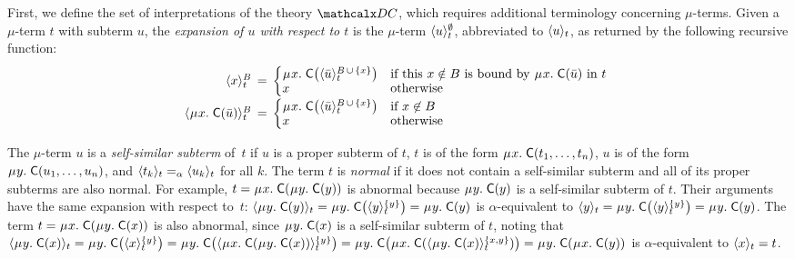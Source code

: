 First, we define the set of interpretations of the theory $\thD$,
which requires additional terminology concerning $\mu$-terms.
Given a $\mu$-term $t$ with subterm $u$,
the \emph{expansion of $u$ with respect to $t$} is the $\mu$-term $\interp{t}{u}^\emptyset$,
abbreviated to
$\interp{t}{u}$, as returned by the following recursive function:
\[\begin{array}{r@{}c@{}l}
\interp{t}{x}^B & {} \,=\, {} &
\textstyle\relax{\begin{cases}
    \MU x.\; \const{C}\smash{\bigl( \interp{t}{ \vec u}^{\smash{B \,\cup\, \{ x \}}}\bigr)} & \text{if this $x \notin B$ is
    bound by $\MU x.\; \const{C}( \vec u )$ in $t$}  \\[-\jot]
    x & \text{otherwise}
\end{cases}} ~ \\
\interp{t}{\MU x.\; \const{C}( \vec u )}^B & = &
\textstyle\begin{cases}
    \MU x.\; \const{C}\smash{\bigl( \interp{t}{ \vec u }^{\smash{B \,\cup\, \{ x \}}}\bigr)} & \text{if }x \not\in B \\[-\jot]
    x & \text{otherwise}
\end{cases}
\end{array}\]
%

The $\mu$-term $u$
is a \emph{self-similar subterm} of~$t$ if
$u$ is a proper subterm of $t$,
$t$ is of the form $\MU x.\; \const{C}( t_1, \ldots, t_n )$,
$u$ is of the form $\MU y.\; \const{C}( u_1, \ldots, u_n )$,
and $\interp{t}{ t_k } \aequiv \interp{t}{ u_k }$ for all $k$. %
The term $t$ is \emph{normal} if it does not contain a self-similar subterm
and all of its proper subterms are also normal.
For example, $t = \MU x.\; \const{C}( \MU y.\; \const{C}( y ) )$ is abnormal
because $\MU y.\; \const{C}( y )$ is a self-similar subterm of $t$.
Their arguments have the same expansion with respect to~$t$:
$\interp{t}{\MU y.\; \const{C}( y )} =
\MU y.\; \const{C}\bigl( \interp{t}{y}^{\smash{\{y\}}} \bigr) =
\MU y.\; \const{C}( y )$
is $\alpha$-equivalent to
$\interp{t}{y} =
\MU y.\; \const{C}\bigl( \interp{t}{y}^{\smash{\{y\}}} \bigr) =
\MU y.\; \const{C}( y )$.
The term $t = \MU x.\; \const{C}( \MU y.\; \const{C}( x ) )$ is also abnormal,
since $\MU y.\; \const{C}( x )$ is a self-similar subterm of $t$,
noting that
%
$\interp{t}{\MU y.\; \const{C}( x )}
 = \MU y.\; \const{C}\bigl( \interp{t}{x}^{\smash{\{y\}}} \bigr)
 = \MU y.\; \const{C}\bigl( \interp{t}{\MU x.\; \const{C}( \MU y.\; \const{C}( x ) ) }^{\smash{\{y\}}} \bigr)
 = \MU y.\; \const{C}\bigl( \MU x.\; \const{C}( \interp{t}{\MU y.\; \const{C}( x )}^{\smash{\{x,y\}}} ) \bigr)
 = \MU y.\allowbreak\; \const{C}( \MU x.\allowbreak\; \const{C}( y ) )$
is $\alpha$-equivalent to $\interp{t}{x} = t$.

